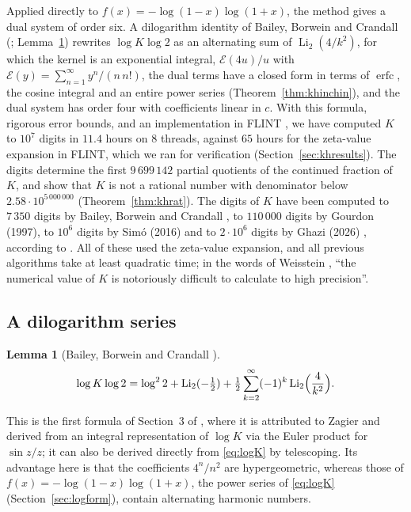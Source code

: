 \documentclass[11pt,reqno]{amsart}
\newtheorem{lemma}[theorem]{Lemma}
\theoremstyle{definition}
\theoremstyle{remark}
\newcommand{\Eip}{\mathcal{E}}
\newcommand{\erfc}{\operatorname{erfc}}
\newcommand{\Li}{\operatorname{Li}}
\begin{document}
Applied directly to $f(x) = -\log(1-x)\log(1+x)$, the method gives a dual system of order six.
A dilogarithm identity of Bailey, Borwein and Crandall (\cite[\S3]{BBC97}; Lemma~\ref{lem:dilog}) rewrites
$\log K\log 2$ as an alternating sum of $\Li_2(4/k^2)$, for which the kernel is an exponential integral, $\Eip(4u)/u$ with $\Eip(y) = \sum_{n=1}^{\infty}y^n/(n\,n!)$,
the dual terms have a closed form in terms of $\erfc$, the cosine integral and an entire power series
(Theorem~\ref{thm:khinchin}), and the dual system has order four with coefficients linear in $c$. With this
formula, rigorous error bounds, and an implementation in FLINT \cite{FLINT}, we have computed $K$ to $10^7$ digits in $11.4$ hours on $8$ threads, against
$65$ hours for the zeta-value expansion in FLINT, which we ran for verification (Section~\ref{sec:khresults}). The
digits determine the first $9\,699\,142$ partial quotients of the continued fraction of $K$, and show that $K$ is not a
rational number with denominator below $2.58\cdot10^{5\,000\,000}$ (Theorem~\ref{thm:khrat}). The digits of $K$
have been computed to $7\,350$ digits by Bailey, Borwein and Crandall \cite{BBC97}, to
$110\,000$ digits by Gourdon (1997), to $10^6$ digits by Sim\'o (2016) and to $2\cdot10^6$ digits by
Ghazi (2026) \cite{Gha26}, according to \cite{MWKdigits}. All of these used the zeta-value expansion, and all previous
algorithms take at least quadratic time; in the words of Weisstein \cite{MWKdigits}, ``the numerical value of $K$ is
notoriously difficult to calculate to high precision''.


\subsection{A dilogarithm series}

\begin{lemma}[{Bailey, Borwein and Crandall \cite[\S3]{BBC97}}]\label{lem:dilog}
\[
  \log K \log 2 = \log^2 2 + \Li_2(-\tfrac12) + \tfrac12\sum_{k=2}^{\infty}(-1)^k \Li_2\Bigl(\frac{4}{k^2}\Bigr).
\]
\end{lemma}

This is the first formula of Section~3 of \cite{BBC97}, where it is attributed to Zagier and derived from an
integral representation of $\log K$ via the Euler product for $\sin z/z$; it can also be derived directly from
\eqref{eq:logK} by telescoping. Its advantage here is that the coefficients $4^n/n^2$ are hypergeometric, whereas
those of $f(x) = -\log(1-x)\log(1+x)$, the power series of \eqref{eq:logK} (Section~\ref{sec:logform}), contain
alternating harmonic numbers.
\end{document}
